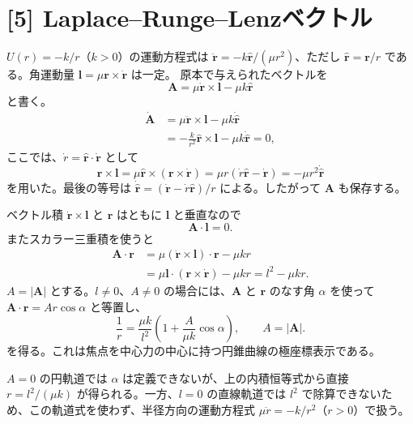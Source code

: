 \documentclass[11pt,a4paper]{article}
\begin{document}
\section*{[5] Laplace--Runge--Lenzベクトル}
$U(r)=-k/r$（$k>0$）の運動方程式は $\ddot{\boldsymbol r}=-k\hat{\boldsymbol r}/(\mu r^2)$、ただし $\hat{\boldsymbol r}=\boldsymbol r/r$ である。角運動量 $\boldsymbol l=\mu\boldsymbol r\times\dot{\boldsymbol r}$ は一定。
原本で与えられたベクトルを
\begin{equation}
 \boldsymbol A=\mu\dot{\boldsymbol r}\times\boldsymbol l-\mu k\hat{\boldsymbol r}
\end{equation}
と書く。
\begin{align}
 \dot{\boldsymbol A}
 &=\mu\ddot{\boldsymbol r}\times\boldsymbol l-\mu k\dot{\hat{\boldsymbol r}}\\
 &=-\frac{k}{r^2}\hat{\boldsymbol r}\times\boldsymbol l-\mu k\dot{\hat{\boldsymbol r}}=0,
\end{align}
ここでは、$\dot r=\hat{\boldsymbol r}\cdot\dot{\boldsymbol r}$ として
\begin{equation}
 \hat{\boldsymbol r}\times\boldsymbol l
 =\mu\hat{\boldsymbol r}\times(\boldsymbol r\times\dot{\boldsymbol r})
 =\mu r(\dot r\hat{\boldsymbol r}-\dot{\boldsymbol r})
 =-\mu r^2\dot{\hat{\boldsymbol r}}
\end{equation}
を用いた。最後の等号は $\dot{\hat{\boldsymbol r}}=(\dot{\boldsymbol r}-\dot r\hat{\boldsymbol r})/r$ による。したがって $\boldsymbol A$ も保存する。

ベクトル積 $\dot{\boldsymbol r}\times\boldsymbol l$ と $\boldsymbol r$ はともに $\boldsymbol l$ と垂直なので
\begin{equation}
 \boxed{\boldsymbol A\cdot\boldsymbol l=0.}
\end{equation}
またスカラー三重積を使うと
\begin{align}
 \boldsymbol A\cdot\boldsymbol r
 &=\mu(\dot{\boldsymbol r}\times\boldsymbol l)\cdot\boldsymbol r-\mu k r\\
 &=\mu\boldsymbol l\cdot(\boldsymbol r\times\dot{\boldsymbol r})-\mu k r
 =l^2-\mu k r.
\end{align}
$A=|\boldsymbol A|$ とする。$l\ne0$、$A\ne0$ の場合には、$\boldsymbol A$ と $\boldsymbol r$ のなす角 $\alpha$ を使って $\boldsymbol A\cdot\boldsymbol r=Ar\cos\alpha$ と等置し、
\begin{equation}
 \boxed{\frac1r=\frac{\mu k}{l^2}
 \left(1+\frac{A}{\mu k}\cos\alpha\right),\qquad A=|\boldsymbol A|.}
\end{equation}
を得る。これは焦点を中心力の中心に持つ円錐曲線の極座標表示である。

$A=0$ の円軌道では $\alpha$ は定義できないが、上の内積恒等式から直接 $r=l^2/(\mu k)$ が得られる。一方、$l=0$ の直線軌道では $l^2$ で除算できないため、この軌道式を使わず、半径方向の運動方程式 $\mu\ddot r=-k/r^2$（$r>0$）で扱う。
\end{document}
